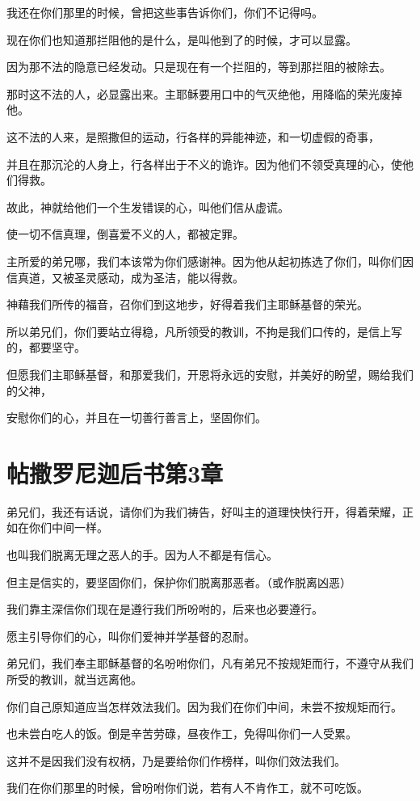 \documentclass[12pt,oneside]{book}
\begin{document}
我还在你们那里的时候，曾把这些事告诉你们，你们不记得吗。

现在你们也知道那拦阻他的是什么，是叫他到了的时候，才可以显露。

因为那不法的隐意已经发动。只是现在有一个拦阻的，等到那拦阻的被除去。

那时这不法的人，必显露出来。主耶稣要用口中的气灭绝他，用降临的荣光废掉他。

这不法的人来，是照撒但的运动，行各样的异能神迹，和一切虚假的奇事，

并且在那沉沦的人身上，行各样出于不义的诡诈。因为他们不领受真理的心，使他们得救。

故此，神就给他们一个生发错误的心，叫他们信从虚谎。

使一切不信真理，倒喜爱不义的人，都被定罪。

主所爱的弟兄哪，我们本该常为你们感谢神。因为他从起初拣选了你们，叫你们因信真道，又被圣灵感动，成为圣洁，能以得救。

神藉我们所传的福音，召你们到这地步，好得着我们主耶稣基督的荣光。

所以弟兄们，你们要站立得稳，凡所领受的教训，不拘是我们口传的，是信上写的，都要坚守。

但愿我们主耶稣基督，和那爱我们，开恩将永远的安慰，并美好的盼望，赐给我们的父神，

安慰你们的心，并且在一切善行善言上，坚固你们。

\chapter{帖撒罗尼迦后书第3章}
弟兄们，我还有话说，请你们为我们祷告，好叫主的道理快快行开，得着荣耀，正如在你们中间一样。

也叫我们脱离无理之恶人的手。因为人不都是有信心。

但主是信实的，要坚固你们，保护你们脱离那恶者。（或作脱离凶恶）

我们靠主深信你们现在是遵行我们所吩咐的，后来也必要遵行。

愿主引导你们的心，叫你们爱神并学基督的忍耐。

弟兄们，我们奉主耶稣基督的名吩咐你们，凡有弟兄不按规矩而行，不遵守从我们所受的教训，就当远离他。

你们自己原知道应当怎样效法我们。因为我们在你们中间，未尝不按规矩而行。

也未尝白吃人的饭。倒是辛苦劳碌，昼夜作工，免得叫你们一人受累。

这并不是因我们没有权柄，乃是要给你们作榜样，叫你们效法我们。

我们在你们那里的时候，曾吩咐你们说，若有人不肯作工，就不可吃饭。
\end{document}
